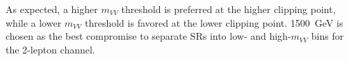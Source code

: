 
As expected, a higher $m_{VV}$ threshold is preferred at the higher clipping point, while a lower $m_{VV}$ threshold is favored at the lower clipping point.
1500~GeV is chosen as the best compromise to separate SRs into low- and high-$m_{VV}$ bins for the 2-lepton channel.

